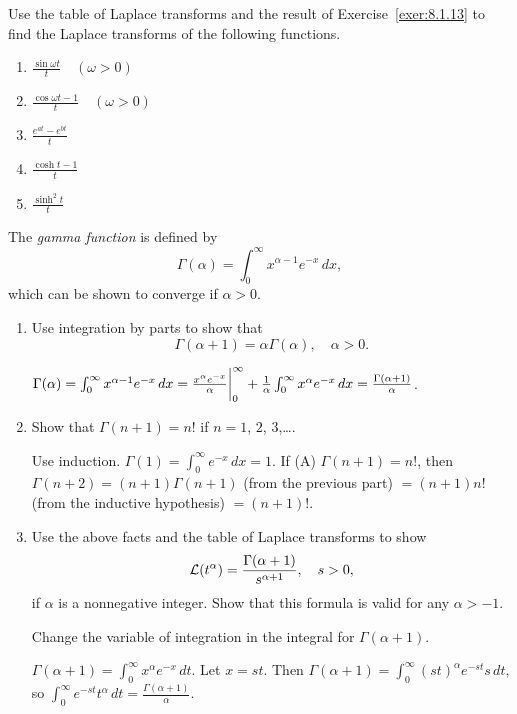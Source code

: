 \documentclass{ximera}
\begin{document}
\begin{problem}\label{exer:8.1.15}
Use the table of Laplace transforms and the result of
Exercise~\ref{exer:8.1.13} to find the Laplace transforms of the following
functions.

\begin{enumerate}
    \item $\frac{\sin\omega t}{t}\quad(\omega>0)$
    \item $\frac{\cos\omega t-1}{t}\quad (\omega>0)$
    \item $\frac{e^{at}-e^{bt}}{t}$
    \item $\frac{\cosh t-1}{t}$
    \item $\frac{\sinh^2 t}{t}$
\end{enumerate}
\end{problem}

\begin{problem}\label{exer:8.1.16}
  The \emph{gamma function} is defined by
$$
\Gamma (\alpha)=\int_0^\infty x^{\alpha-1}e^{-x}\,dx,
$$
which can be shown to converge if $\alpha>0$.

\begin{enumerate}
\item %
 Use integration by parts to show that
$$
\Gamma (\alpha+1)=\alpha\Gamma (\alpha),\quad\alpha>0.
$$
\begin{solution}
$\Gamma (\alpha)=\int_0^\infty x^{\alpha-1}e^{-x}\,dx=
{x^\alpha e^{-x}\over\alpha}\bigg|_0^\infty+\frac{1}{\alpha}
\int_0^\infty x^\alpha e^{-x}\,dx=\frac{\Gamma(\alpha+1)}{\alpha}$.
\end{solution}

\item %
 Show that $\Gamma(n+1)=n!$ if $n=1$, $2$, $3$,\dots.

\begin{solution}
Use induction. $\Gamma(1)=\int_0^\infty e^{-x}\,dx=1$.
If (A) $\Gamma(n+1)=n!$, then $\Gamma(n+2)=(n+1)\Gamma(n+1)$ (from the previous part) $=(n+1)n!$ (from the inductive hypothesis) $=(n+1)!$.
\end{solution}
 
\item %
 Use the above facts and the table of Laplace transforms to show
$$
{\cal L}(t^\alpha)=\frac{\Gamma (\alpha+1)}{s^{\alpha+1}},\quad s>0,
$$
if $\alpha$ is a nonnegative integer.  Show that this formula is valid for
any $\alpha>-1$.
\begin{hint}
Change the variable of integration in the
integral for $\Gamma (\alpha+1)$.
\end{hint}

\begin{solution}
$\Gamma(\alpha+1)=\int_0^\infty x^\alpha e^{-x}\,dt$. Let
$x=st$. Then $\Gamma(\alpha+1)=\int_0^\infty (st)^\alpha
e^{-st}s\,dt$, so $\int_0^\infty
e^{-st}t^\alpha\,dt=\frac{\Gamma(\alpha+1)}{\alpha}$.
\end{solution}

\end{enumerate}
\end{problem}
\end{document}
